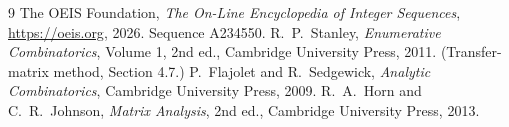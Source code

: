 \documentclass[11pt,a4paper]{article}
\theoremstyle{plain}
\theoremstyle{definition}
\begin{document}
\begin{thebibliography}{9}
 The OEIS Foundation, \emph{The On-Line Encyclopedia of Integer
Sequences}, \url{https://oeis.org}, 2026. Sequence A234550.
 R.~P.~Stanley, \emph{Enumerative Combinatorics}, Volume 1, 2nd ed.,
Cambridge University Press, 2011. (Transfer-matrix method, Section 4.7.)
 P.~Flajolet and R.~Sedgewick, \emph{Analytic Combinatorics}, Cambridge
University Press, 2009.
 R.~A.~Horn and C.~R.~Johnson, \emph{Matrix Analysis}, 2nd ed., Cambridge
University Press, 2013.
\end{thebibliography}
\end{document}
